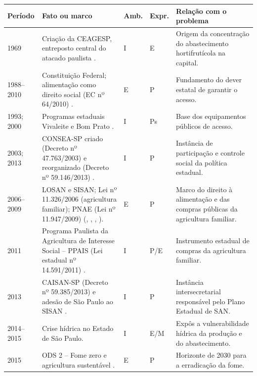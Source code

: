 \documentclass[
	12pt,				%
	openright,			%
	oneside,			%
	a4paper,			%
	chapter=TITLE,		%
	section=TITLE,		%
	english,			%
	french,				%
	spanish,			%
	brazil,				%
 ]{abntex2}
\begin{document}
\begin{quadro}[!htbp]
\centering
\caption{Antecedentes da segurança alimentar em São Paulo por ambiente e Expressão do Poder}
\label{qua:antecedentes-seguranca}
\footnotesize
\renewcommand{\arraystretch}{1.05}
\setlength{\tabcolsep}{3pt}
\begin{tabularx}{\textwidth}{|p{1.65cm}|>{\raggedright\arraybackslash}X|>{\centering\arraybackslash}p{0.9cm}|>{\centering\arraybackslash}p{0.9cm}|>{\raggedright\arraybackslash}p{5.2cm}|}
\hline
\textbf{Período} & \textbf{Fato ou marco} & \textbf{Amb.} & \textbf{Expr.} & \textbf{Relação com o problema} \\
\hline
1969 & Criação da CEAGESP, entreposto central do atacado paulista \cite{ceagesp_historico}. & I & E & Origem da concentração do abastecimento hortifrutícola na capital. \\
\hline
1988--2010 & Constituição Federal; alimentação como direito social (EC nº 64/2010) \cite{brasil1988}. & E & P & Fundamento do dever estatal de garantir o acesso. \\
\hline
1993; 2000 & Programas estaduais Vivaleite e Bom Prato \cite{iea_vivaleite,governo_sp_bomprato2025}. & I & Ps & Base dos equipamentos públicos de acesso. \\
\hline
2003; 2013 & CONSEA-SP criado (Decreto nº 47.763/2003) e reorganizado (Decreto nº 59.146/2013) \cite{saopaulo2013consea}. & I & P & Instância de participação e controle social da política estadual. \\
\hline
2006--2009 & LOSAN e SISAN; Lei nº 11.326/2006 (agricultura familiar); PNAE (Lei nº 11.947/2009) (\citeauthor{brasil2006a}, \citeyear{brasil2006a}, \citeyear{brasil2006b}, \citeyear{brasil2009}). & E & P & Marco do direito à alimentação e das compras públicas da agricultura familiar. \\
\hline
2011 & Programa Paulista da Agricultura de Interesse Social -- PPAIS (Lei estadual nº 14.591/2011) \cite{saopaulo2011ppais}. & I & P/E & Instrumento estadual de compras da agricultura familiar. \\
\hline
2013 & CAISAN-SP (Decreto nº 59.385/2013) e adesão de São Paulo ao SISAN \cite{saopaulo2013caisan}. & I & P & Instância intersecretarial responsável pelo Plano Estadual de SAN. \\
\hline
2014--2015 & Crise hídrica no Estado de São Paulo. & I & E/M & Expôs a vulnerabilidade hídrica da produção e do abastecimento. \\
\hline
2015 & ODS 2 -- Fome zero e agricultura sustentável \cite{onu2015}. & E & P & Horizonte de 2030 para a erradicação da fome. \\

\end{tabularx}
\end{quadro}
\end{document}

